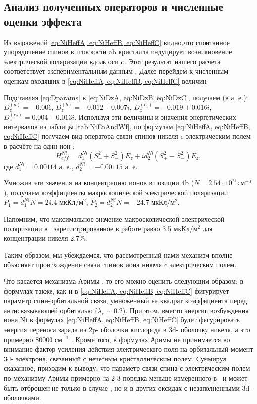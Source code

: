 \subsection{Анализ полученных операторов и численные оценки эффекта}\label{subsec:ch2/sec3/sub3}

Из выражений \cref{eq:NiHeffA, eq:NiHeffB, eq:NiHeffC} видно,что спонтанное упорядочение спинов \niIon в плоскости ab кристалла индуцирует возникновение электрической поляризации вдоль оси \textit{с}. Этот результат нашего расчета соответствует экспериментальным данным \cite{Khanh2013}. Далее перейдем к численным оценкам входящих в \cref{eq:NiHeffA, eq:NiHeffB, eq:NiHeffC} величин.

Подставляя \cref{eq:Dparams} в \cref{eq:NiDzA, eq:NiDzB, eq:NiDzC}, получаем (в а. е.): $D_{z}^{(a)}=-0.006$, $D_{z}^{(b)}=-0.012+0.007 i$, $D_{z}^{\left(c_{1}\right)}=-0.019+0.016 i$, $D_{z}^{\left(c_{2}\right)}=0.004-0.013 i$. Используя эти величины и значения энергетических интервалов из таблицы \cref{tab:NiEnAndWf}, по формулам \cref{eq:NiHeffA, eq:NiHeffB, eq:NiHeffC} получаем вид оператора связи спинов никеля c электрическим полем в расчёте на один ион \niIon:
\begin{equation}
	\label{eq:NiHeffSum}
	H_{eff}^{Ni}=d_{1}^{Ni}\left(S_{+}^{2}+S_{-}^{2}\right) E_{z}+i d_{2}^{Ni}\left(S_{+}^{2}-S_{-}^{2}\right) E_{z},
\end{equation}
где $d_{1}^{Ni}=0.00114$ а. е., $d_{2}^{Ni}=-0.00115$ а. е.

Умножив эти значения на концентрацию ионов в позиции 4b ($N\mathop{=}2.54\mathop{\cdot}10^{21} см^{-3}$), получаем коэффициенты макроскопической электрической поляризации $P_{1}=d_{1}^{Ni}N=24.4$ мкКл/м$^{2}$, $P_{2}=d_{2}^{Ni}N=-24.7$ мкКл/м$^{2}$.

Напомним, что максимальное значение макроскопической электрической поляризации в \ncbo, зарегистрированное в работе \cite{Khanh2013} равно 3.5 мкКл/м$^{2}$ для концентрации никеля 2.7\%.

Таким образом, мы убеждаемся, что рассмотренный нами механизм вполне объясняет происхождение связи спинов иона никеля c электрическим полем. 

Что касается механизма Аримы \cite{Arima2007}, то его можно оценить следующим образом: в формулах \cite{Arima2007} также, как и в \cref{eq:NiHeffA, eq:NiHeffB, eq:NiHeffC} фигурирует параметр спин-орбитальной связи, умноженный на квадрат коэффициента перед антисвязывающей орбиталью ($\lambda_{\sigma}\sim0.2$). При этом, вместо энергии возбуждения иона Ni в формулах \cref{eq:NiHeffA, eq:NiHeffB, eq:NiHeffC} будет фигурировать энергия переноса заряда из 2p- оболочки кислорода в 3d- оболочку никеля, а это примерно 80000 см$^{-1}$ \cite{Simonetti1977}. Кроме того, в формулах Аримы \cite{Arima2007} не принимается во внимание фактор усиления действия электрического поля на орбитальный момент 3d- электрона, связанный с нечетным кристаллическим полем. Суммируя сказанное, приходим к выводу, что параметр связи спина с электрическим полем по механизму Аримы примерно на 2-3 порядка меньше измеренного в \ncbo\ и может быть отброшен не только в случае \ncbo, но и в других оксидах с незаполненными 3d-оболочками.

